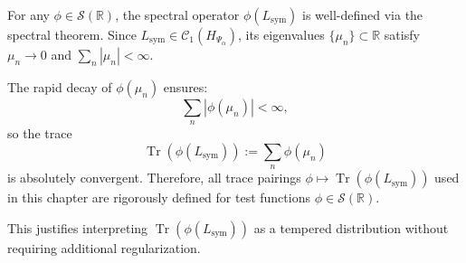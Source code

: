 \begin{remark}
\label{rem:functional_calculus_trace}
For any \( \phi \in \mathcal{S}(\mathbb{R}) \), the spectral operator \( \phi(L_{\mathrm{sym}}) \) is well-defined via the spectral theorem. Since \( L_{\mathrm{sym}} \in \mathcal{C}_1(H_{\Psi_\alpha}) \), its eigenvalues \( \{ \mu_n \} \subset \mathbb{R} \) satisfy \( \mu_n \to 0 \) and \( \sum_n |\mu_n| < \infty \).

The rapid decay of \( \phi(\mu_n) \) ensures:
\[
\sum_n |\phi(\mu_n)| < \infty,
\]
so the trace
\[
\operatorname{Tr}(\phi(L_{\mathrm{sym}})) := \sum_n \phi(\mu_n)
\]
is absolutely convergent. Therefore, all trace pairings \( \phi \mapsto \operatorname{Tr}(\phi(L_{\mathrm{sym}})) \) used in this chapter are rigorously defined for test functions \( \phi \in \mathcal{S}(\mathbb{R}) \).

\medskip

\noindent
This justifies interpreting \( \operatorname{Tr}(\phi(L_{\mathrm{sym}})) \) as a tempered distribution without requiring additional regularization.
\end{remark}
